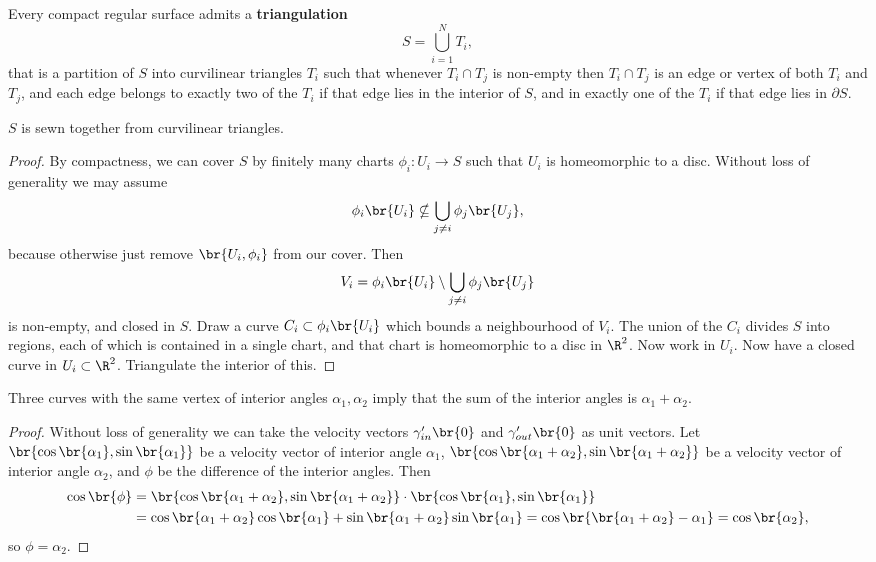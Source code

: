 \begin{proposition}
Every compact regular surface admits a \textbf{triangulation}
$$ S = \bigcup_{i = 1}^N T_i, $$
that is a partition of $ S $ into curvilinear triangles $ T_i $ such that whenever $ T_i \cap T_j $ is non-empty then $ T_i \cap T_j $ is an edge or vertex of both $ T_i $ and $ T_j $, and each edge belongs to exactly two of the $ T_i $ if that edge lies in the interior of $ S $, and in exactly one of the $ T_i $ if that edge lies in $ \partial S $.
\end{proposition}

$ S $ is sewn together from curvilinear triangles.

\begin{proof}
By compactness, we can cover $ S $ by finitely many charts $ \phi_i : U_i \to S $ such that $ U_i $ is homeomorphic to a disc. Without loss of generality we may assume
$$ \phi_i\br{U_i} \nsubseteq \bigcup_{j \ne i} \phi_j\br{U_j}, $$
because otherwise just remove $ \br{U_i, \phi_i} $ from our cover. Then
$$ V_i = \phi_i\br{U_i} \setminus \bigcup_{j \ne i} \phi_j\br{U_j} $$
is non-empty, and closed in $ S $. Draw a curve $ C_i \subset \phi_i\br{U_i} $ which bounds a neighbourhood of $ V_i $. The union of the $ C_i $ divides $ S $ into regions, each of which is contained in a single chart, and that chart is homeomorphic to a disc in $ \R^2 $. Now work in $ U_i $. Now have a closed curve in $ U_i \subset \R^2 $. Triangulate the interior of this.
\end{proof}


\begin{lemma}
Three curves with the same vertex of interior angles $ \alpha_1, \alpha_2 $ imply that the sum of the interior angles is $ \alpha_1 + \alpha_2 $.
\end{lemma}

\begin{proof}
Without loss of generality we can take the velocity vectors $ \gamma_{in}'\br{0} $ and $ \gamma_{out}'\br{0} $ as unit vectors. Let $ \br{\cos\br{\alpha_1}, \sin\br{\alpha_1}} $ be a velocity vector of interior angle $ \alpha_1 $, $ \br{\cos\br{\alpha_1 + \alpha_2}, \sin\br{\alpha_1 + \alpha_2}} $ be a velocity vector of interior angle $ \alpha_2 $, and $ \phi $ be the difference of the interior angles. Then
\begin{align*}
\cos\br{\phi}
& = \br{\cos\br{\alpha_1 + \alpha_2}, \sin\br{\alpha_1 + \alpha_2}} \cdot \br{\cos\br{\alpha_1}, \sin\br{\alpha_1}} \\
& = \cos\br{\alpha_1 + \alpha_2}\cos\br{\alpha_1} + \sin\br{\alpha_1 + \alpha_2}\sin\br{\alpha_1}
= \cos\br{\br{\alpha_1 + \alpha_2} - \alpha_1}
= \cos\br{\alpha_2},
\end{align*}
so $ \phi = \alpha_2 $.
\end{proof}

